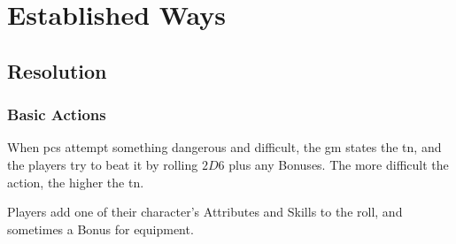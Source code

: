 \chapter{Established Ways}
\label{coreRules}


\section{Resolution}
\label{basicaction}

\begin{multicols}{2}

\newcommand{\TNChart}{

  \noindent
  \begin{boxtable}[cX]

    \textbf{\glsentrytext{tn}} & \textbf{Task} \\\hline

    2 & Automatic \\

    4 & Trivial \\

    6 & Easy \\

    8 & Serious \\

    10 & Tricky \\

    12 & Professional \\

    14 & Specialist \\

    16 & Extreme \\

    18 & Legendary \\

    20 & Implausible \\

  \end{boxtable}
}

\subsection{Basic Actions}
When \glspl{pc} attempt something dangerous and difficult, the \gls{gm} states the \gls{tn}, and the players try to beat it by rolling $2D6$ plus any Bonuses.
The more difficult the action, the higher the \gls{tn}.

Players add one of their character's Attributes and Skills to the roll, and sometimes a Bonus for equipment.


\end{multicols}
